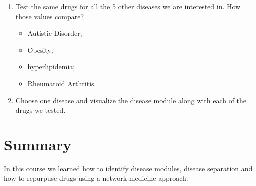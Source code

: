 \documentclass[
]{book}
\providecommand{\tightlist}{%
  \setlength{\itemsep}{0pt}\setlength{\parskip}{0pt}}
\begin{document}
\begin{enumerate}
\def\labelenumi{\arabic{enumi}.}
\item
  Test the same drugs for all the 5 other diseases we are interested in. How those values compare?

  \begin{itemize}
  \tightlist
  \item
    Autistic Disorder;
  \item
    Obesity;
  \item
    hyperlipidemia;
  \item
    Rheumatoid Arthritis.
  \end{itemize}
\item
  Choose one disease and visualize the disease module along with each of the drugs we tested.
\end{enumerate}

\hypertarget{summary}{%
\chapter{Summary}\label{summary}}

In this course we learned how to identify disease modules, disease separation and how to repurpuse drugs using a network medicine approach.

  
\end{document}
